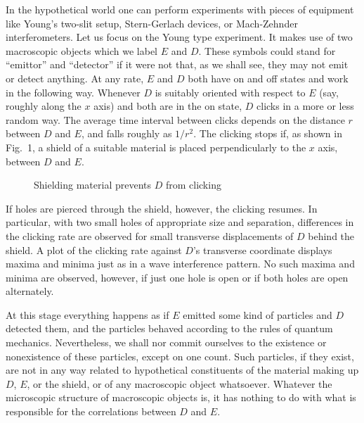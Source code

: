 \documentclass[12pt]{article}
\begin{document}
\begin{sloppypar}
In the hypothetical world one can perform
experiments with pieces of equipment like 
Young's two-slit setup, Stern-Gerlach devices, or
Mach-Zehnder interferometers.  Let us focus on the
Young type experiment.  It makes use of two macroscopic
objects which we label $E$ and $D$.  These symbols could
stand for ``emittor'' and ``detector'' if it were not
that, as we shall see, they may not emit or detect
anything.  At any rate, $E$ and $D$
both have on and off states and work in the
following way.  Whenever $D$ is suitably
oriented with respect to $E$ (say, roughly
along the $x$ axis) and both are in
the on state, $D$ clicks in a more or less
random way.  The average time interval
between clicks depends on the distance $r$
between $D$ and $E$, and falls roughly as $1/r^2$.
The clicking stops if, as shown in Fig.~1, a shield of a
suitable material is placed perpendicularly
to the $x$ axis, between $D$ and $E$.
\end{sloppypar}


\begin{figure}[bt]
\begin{center}
\end{center}
\caption{Shielding material prevents $D$ from clicking}
\label{fig1}
\end{figure}

If holes are pierced through the shield, however,
the clicking resumes.  In particular, with
two small holes of appropriate size and
separation, differences in the clicking rate
are observed for small transverse displacements
of $D$ behind the shield.  A
plot of the clicking rate against $D$'s
transverse coordinate displays maxima and
minima just as in a wave interference pattern.
No such maxima and minima are observed, however,
if just one hole is open or if both holes
are open alternately.

At this stage everything happens as if $E$
emitted some kind of particles and $D$
detected them, and the particles behaved
according to the rules of quantum mechanics.
Nevertheless, we shall nor commit ourselves
to the existence or nonexistence of these
particles, except on one count.  Such particles,
if they exist, are not in any way related to
hypothetical constituents of the material
making up $D$, $E$, or the shield, or of any
macroscopic object whatsoever.  Whatever
the microscopic structure of macroscopic
objects is, it has nothing to do with what is
responsible for the correlations between
$D$ and $E$.
\end{document}

